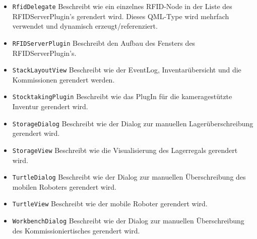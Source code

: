 \begin{itemize}
    \item \verb|RfidDelegate| Beschreibt wie ein einzelnes RFID-Node in der Liste des RFIDServerPlugin's gerendert wird. Dieses QML-Type wird mehrfach verwendet und dynamisch erzeugt/referenziert.
    \item \verb|RFIDServerPlugin| Beschreibt den Aufbau des Fensters des RFIDServerPlugin's.
    \item \verb|StackLayoutView| Beschreibt wie der EventLog, Inventarübersicht und die Kommissionen gerendert werden.
    \item \verb|StocktakingPlugin| Beschreibt wie das PlugIn für die kameragestützte Inventur gerendert wird.
    \item \verb|StorageDialog| Beschreibt wie der Dialog zur manuellen Lagerüberschreibung gerendert wird.
    \item \verb|StorageView| Beschreibt wie die Visualisierung des Lagerregals gerendert wird.
    \item \verb|TurtleDialog| Beschreibt wie der Dialog zur manuellen Überschreibung des mobilen Roboters gerendert wird.
    \item \verb|TurtleView| Beschreibt wie der mobile Roboter gerendert wird.
    \item \verb|WorkbenchDialog| Beschreibt wie der Dialog zur manuellen Überschreibung des Kommissioniertisches gerendert wird.
\end{itemize}
